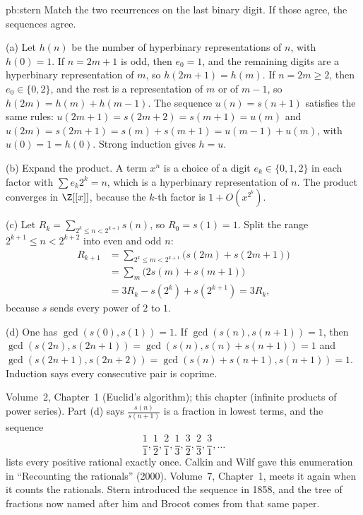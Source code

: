\begin{solution}{pb:stern}
\idea Match the two recurrences on the last binary digit. If those agree, the sequences agree.

\writeup (a) Let $h(n)$ be the number of hyperbinary representations of $n$, with $h(0)=1$. If $n=2m+1$ is odd, then $e_0=1$, and the
remaining digits are a hyperbinary representation of $m$, so $h(2m+1)=h(m)$. If $n=2m\ge2$, then $e_0\in\{0,2\}$, and the rest is a representation of $m$ or of $m-1$, so
$h(2m)=h(m)+h(m-1)$. The sequence $u(n)=s(n+1)$ satisfies the same rules: $u(2m+1)=s(2m+2)=s(m+1)=u(m)$ and
$u(2m)=s(2m+1)=s(m)+s(m+1)=u(m-1)+u(m)$, with $u(0)=1=h(0)$. Strong induction gives $h=u$.

(b) Expand the product. A term $x^n$ is a choice of a digit $e_k\in\{0,1,2\}$ in each factor with $\sum e_k2^k=n$, which is a
hyperbinary representation of $n$. The product converges in $\Z[[x]]$, because the $k$-th factor is $1+O(x^{2^k})$.

(c) Let $R_k=\sum_{2^k\le n<2^{k+1}}s(n)$, so $R_0=s(1)=1$. Split the range $2^{k+1}\le n<2^{k+2}$ into even and odd $n$:
\[
\begin{aligned}
R_{k+1}&=\sum_{2^k\le m<2^{k+1}}\bigl(s(2m)+s(2m+1)\bigr)\\
&=\sum_m\bigl(2s(m)+s(m+1)\bigr)\\
&=3R_k-s(2^k)+s(2^{k+1})=3R_k,
\end{aligned}
\]
because $s$ sends every power of $2$ to $1$.

(d) One has $\gcd(s(0),s(1))=1$. If $\gcd(s(n),s(n+1))=1$, then $\gcd(s(2n),s(2n+1))=\gcd(s(n),s(n)+s(n+1))=1$ and
$\gcd(s(2n+1),s(2n+2))=\gcd(s(n)+s(n+1),s(n+1))=1$. Induction says every consecutive pair is coprime.

\tools Volume~2, Chapter~1 (Euclid's algorithm); this chapter (infinite products of power series).
\leads Part (d) says $\frac{s(n)}{s(n+1)}$ is a fraction in lowest terms, and the sequence
\[
\frac11,\frac12,\frac21,\frac13,\frac32,\frac23,\frac31,\dots
\]
lists every positive rational exactly once. Calkin and Wilf gave this enumeration in ``Recounting the rationals'' (2000). Volume~7,
Chapter~1, meets it again when it counts the rationals. Stern introduced the sequence in 1858, and the tree of fractions now named after him and Brocot comes from that
same paper.
\end{solution}

